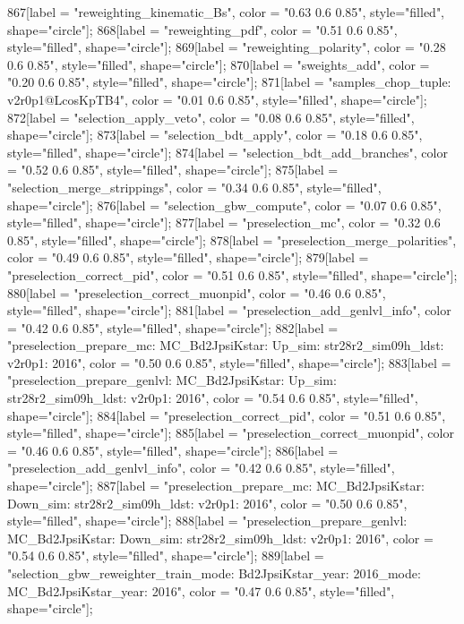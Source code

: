 {	867[label = "reweighting_kinematic_Bs", color = "0.63 0.6 0.85", style="filled", shape="circle"];
	868[label = "reweighting_pdf", color = "0.51 0.6 0.85", style="filled", shape="circle"];
	869[label = "reweighting_polarity", color = "0.28 0.6 0.85", style="filled", shape="circle"];
	870[label = "sweights_add", color = "0.20 0.6 0.85", style="filled", shape="circle"];
	871[label = "samples_chop_tuple\nversion: v2r0p1@LcosKpTB4", color = "0.01 0.6 0.85", style="filled", shape="circle"];
	872[label = "selection_apply_veto", color = "0.08 0.6 0.85", style="filled", shape="circle"];
	873[label = "selection_bdt_apply", color = "0.18 0.6 0.85", style="filled", shape="circle"];
	874[label = "selection_bdt_add_branches", color = "0.52 0.6 0.85", style="filled", shape="circle"];
	875[label = "selection_merge_strippings", color = "0.34 0.6 0.85", style="filled", shape="circle"];
	876[label = "selection_gbw_compute", color = "0.07 0.6 0.85", style="filled", shape="circle"];
	877[label = "preselection_mc", color = "0.32 0.6 0.85", style="filled", shape="circle"];
	878[label = "preselection_merge_polarities", color = "0.49 0.6 0.85", style="filled", shape="circle"];
	879[label = "preselection_correct_pid", color = "0.51 0.6 0.85", style="filled", shape="circle"];
	880[label = "preselection_correct_muonpid", color = "0.46 0.6 0.85", style="filled", shape="circle"];
	881[label = "preselection_add_genlvl_info", color = "0.42 0.6 0.85", style="filled", shape="circle"];
	882[label = "preselection_prepare_mc\nmode: MC_Bd2JpsiKstar\npolarity: Up\nstrip_sim: str28r2_sim09h_ldst\nversion: v2r0p1\nyear: 2016", color = "0.50 0.6 0.85", style="filled", shape="circle"];
	883[label = "preselection_prepare_genlvl\nmode: MC_Bd2JpsiKstar\npolarity: Up\nstrip_sim: str28r2_sim09h_ldst\nversion: v2r0p1\nyear: 2016", color = "0.54 0.6 0.85", style="filled", shape="circle"];
	884[label = "preselection_correct_pid", color = "0.51 0.6 0.85", style="filled", shape="circle"];
	885[label = "preselection_correct_muonpid", color = "0.46 0.6 0.85", style="filled", shape="circle"];
	886[label = "preselection_add_genlvl_info", color = "0.42 0.6 0.85", style="filled", shape="circle"];
	887[label = "preselection_prepare_mc\nmode: MC_Bd2JpsiKstar\npolarity: Down\nstrip_sim: str28r2_sim09h_ldst\nversion: v2r0p1\nyear: 2016", color = "0.50 0.6 0.85", style="filled", shape="circle"];
	888[label = "preselection_prepare_genlvl\nmode: MC_Bd2JpsiKstar\npolarity: Down\nstrip_sim: str28r2_sim09h_ldst\nversion: v2r0p1\nyear: 2016", color = "0.54 0.6 0.85", style="filled", shape="circle"];
	889[label = "selection_gbw_reweighter_train\ndata_mode: Bd2JpsiKstar\ndata_year: 2016\nmc_mode: MC_Bd2JpsiKstar\nmc_year: 2016", color = "0.47 0.6 0.85", style="filled", shape="circle"];
}
